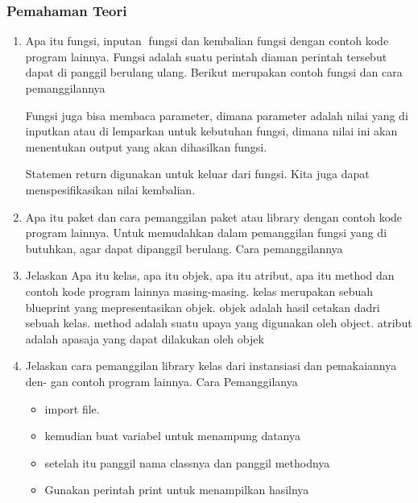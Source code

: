 \subsubsection{Pemahaman Teori}
\begin{enumerate}
    \item Apa itu fungsi, inputan fungsi dan kembalian fungsi dengan contoh kode program
    lainnya.
    Fungsi adalah suatu perintah diaman perintah tersebut dapat di panggil berulang ulang.
    Berikut merupakan contoh fungsi dan cara pemanggilannya
    

    Fungsi juga bisa membaca parameter, dimana parameter adalah nilai yang di inputkan atau di lemparkan untuk kebutuhan fungsi, dimana nilai ini akan menentukan output yang akan dihasilkan fungsi.
    

    Statemen return digunakan untuk keluar dari fungsi. Kita juga dapat menspesifikasikan nilai kembalian.
    

    \item Apa itu paket dan cara pemanggilan paket atau library dengan contoh kode
    program lainnya.
    Untuk memudahkan dalam pemanggilan fungsi yang di butuhkan, agar dapat dipanggil berulang.
    Cara pemanggilannya
    

    \item Jelaskan Apa itu kelas, apa itu objek, apa itu atribut, apa itu method dan
    contoh kode program lainnya masing-masing.
    kelas merupakan sebuah blueprint yang mepresentasikan objek.
    objek adalah hasil cetakan dadri sebuah kelas.
    method adalah suatu upaya yang digunakan oleh object.
    atribut adalah apasaja yang dapat dilakukan oleh objek
    

    \item Jelaskan cara pemanggilan library kelas dari instansiasi dan pemakaiannya den-
    gan contoh program lainnya.
    Cara Pemanggilanya
    \begin{itemize}
        \item import file.
        \item kemudian buat variabel untuk menampung datanya
        \item setelah itu panggil nama classnya dan panggil methodnya
        \item Gunakan perintah print untuk menampilkan hasilnya


\end{itemize}
\end{enumerate}
